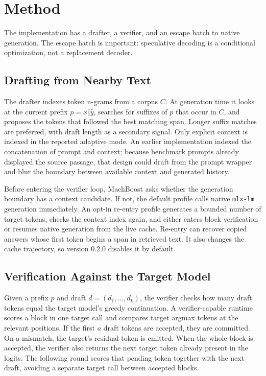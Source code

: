 \documentclass[11pt]{article}
\begin{document}
\section{Method}
The implementation has a drafter, a verifier, and an escape hatch to native generation. The escape hatch is important: speculative decoding is a conditional optimization, not a replacement decoder.

\subsection{Drafting from Nearby Text}
The drafter indexes token n-grams from a corpus $C$. At generation time it looks at the current prefix $p = x \Vert \hat{y}$, searches for suffixes of $p$ that occur in $C$, and proposes the tokens that followed the best matching span. Longer suffix matches are preferred, with draft length as a secondary signal. Only explicit context is indexed in the reported adaptive mode. An earlier implementation indexed the concatenation of prompt and context; because benchmark prompts already displayed the source passage, that design could draft from the prompt wrapper and blur the boundary between available context and generated history.

Before entering the verifier loop, MachBoost asks whether the generation boundary has a context candidate. If not, the default profile calls native \texttt{mlx-lm} generation immediately. An opt-in re-entry profile generates a bounded number of target tokens, checks the context index again, and either enters block verification or resumes native generation from the live cache. Re-entry can recover copied answers whose first token begins a span in retrieved text. It also changes the cache trajectory, so version 0.2.0 disables it by default.

\subsection{Verification Against the Target Model}
Given a prefix $p$ and draft $d=(d_1,\dots,d_k)$, the verifier checks how many draft tokens equal the target model's greedy continuation. A verifier-capable runtime scores a block in one target call and compares target argmax tokens at the relevant positions. If the first $a$ draft tokens are accepted, they are committed. On a mismatch, the target's residual token is emitted. When the whole block is accepted, the verifier also returns the next target token already present in the logits. The following round scores that pending token together with the next draft, avoiding a separate target call between accepted blocks.
\end{document}
